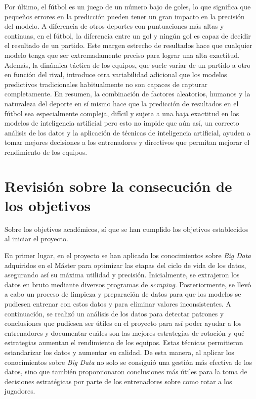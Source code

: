 Por último, el fútbol es un juego de un número bajo de goles, lo que significa que pequeños errores en la predicción pueden tener un gran impacto en la precisión del modelo. A diferencia de otros deportes con puntuaciones más altas y continuas, en el fútbol, la diferencia entre un gol y ningún gol es capaz de decidir el resultado de un partido. Este margen estrecho de resultados hace que cualquier modelo tenga que ser extremadamente preciso para lograr una alta exactitud. Además, la dinámica táctica de los equipos, que suele variar de un partido a otro en función del rival, introduce otra variabilidad adicional que los modelos predictivos tradicionales habitualmente no son capaces de capturar completamente. En resumen, la combinación de factores aleatorios, humanos y la naturaleza del deporte en sí mismo hace que la predicción de resultados en el fútbol sea especialmente compleja, difícil y sujeta a una baja exactitud en los modelos de inteligencia artificial pero esto no impide que aún así, un correcto análisis de los datos y la aplicación de técnicas de inteligencia artificial, ayuden a tomar mejores decisiones a los entrenadores y directivos que permitan mejorar el rendimiento de los equipos.



\section{Revisión sobre la consecución de los objetivos}



Sobre los objetivos académicos, sí que se han cumplido los objetivos establecidos al iniciar el proyecto. 

En primer lugar, en el proyecto se han aplicado los conocimientos sobre \textit{Big Data} adquiridos en el Máster para optimizar las etapas del ciclo de vida de los datos, asegurando así su máxima utilidad y precisión. Inicialmente, se extrajeron los datos en bruto mediante diversos programas de \textit{scraping}. Posteriormente, se llevó a cabo un proceso de limpieza y preparación de datos para que los modelos se pudiesen entrenar con estos datos y para eliminar valores inconsistentes. A continuación, se realizó un análisis de los datos para detectar patrones y conclusiones que pudiesen ser útiles en el proyecto para así poder ayudar a los entrenadores y documentar cuáles son las mejores estrategias de rotación y qué estrategias aumentan el rendimiento de los equipos. Estas técnicas permitieron estandarizar los datos y aumentar su calidad. De esta manera, al aplicar los conocimientos sobre \textit{Big Data} no solo se consiguió una gestión más efectiva de los datos, sino que también proporcionaron conclusiones más útiles para la toma de decisiones estratégicas por parte de los entrenadores sobre como rotar a los jugadores.

